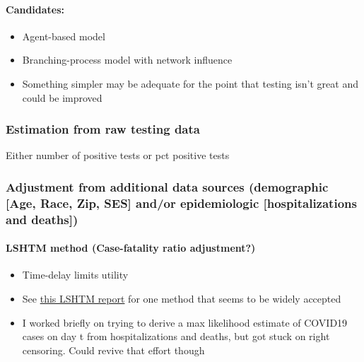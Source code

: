 \documentclass[
]{article}
\providecommand{\tightlist}{%
  \setlength{\itemsep}{0pt}\setlength{\parskip}{0pt}}
\begin{document}
\hypertarget{candidates}{%
\paragraph{Candidates:}\label{candidates}}

\begin{itemize}
\tightlist
\item
  Agent-based model\\
\item
  Branching-process model with network influence\\
\item
  Something simpler may be adequate for the point that testing isn't
  great and could be improved
\end{itemize}

\hypertarget{estimation-from-raw-testing-data}{%
\subsubsection{Estimation from raw testing
data}\label{estimation-from-raw-testing-data}}

Either number of positive tests or pct positive tests

\hypertarget{adjustment-from-additional-data-sources-demographic-age-race-zip-ses-andor-epidemiologic-hospitalizations-and-deaths}{%
\subsubsection{Adjustment from additional data sources (demographic
{[}Age, Race, Zip, SES{]} and/or epidemiologic {[}hospitalizations and
deaths{]})}\label{adjustment-from-additional-data-sources-demographic-age-race-zip-ses-andor-epidemiologic-hospitalizations-and-deaths}}

\hypertarget{lshtm-method-case-fatality-ratio-adjustment}{%
\paragraph{LSHTM method (Case-fatality ratio
adjustment?)}\label{lshtm-method-case-fatality-ratio-adjustment}}

\begin{itemize}
\tightlist
\item
  Time-delay limits utility\\
\item
  See
  \href{https://cmmid.github.io/topics/covid19/global_cfr_estimates.html}{this
  LSHTM report} for one method that seems to be widely accepted\\
\item
  I worked briefly on trying to derive a max likelihood estimate of
  COVID19 cases on day t from hospitalizations and deaths, but got stuck
  on right censoring. Could revive that effort though
\end{itemize}
\end{document}
